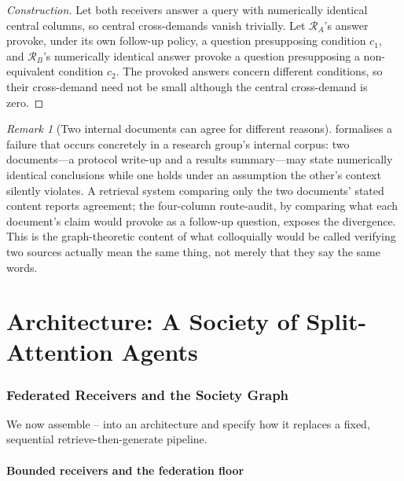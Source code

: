 \documentclass[11pt,twocolumn,a4paper]{article}
\theoremstyle{frathm}
\theoremstyle{definition}
\theoremstyle{remark}
\newtheorem{remark}[theorem]{Remark}
\newcommand{\Rec}{\mathcal{R}}
\begin{document}
\begin{proof}[Construction]
Let both receivers answer a query with numerically identical central
columns, so central cross-demands vanish trivially. Let $\Rec_A$'s answer
provoke, under its own follow-up policy, a question presupposing
condition $c_1$, and $\Rec_B$'s numerically identical answer provoke a
question presupposing a non-equivalent condition $c_2$. The provoked
answers concern different conditions, so their cross-demand need not be
small although the central cross-demand is zero.
\end{proof}

\begin{remark}[Two internal documents can agree for different reasons]
\label{rem:false-friend-deployment}
 formalises a failure that occurs concretely in a
research group's internal corpus: two documents---a protocol write-up and
a results summary---may state numerically identical conclusions while one
holds under an assumption the other's context silently violates. A
retrieval system comparing only the two documents' stated content reports
agreement; the four-column route-audit, by comparing what each document's
claim would provoke as a follow-up question, exposes the divergence. This
is the graph-theoretic content of what colloquially would be called
verifying two sources actually mean the same thing, not merely that they
say the same words.
\end{remark}

\part{Architecture: A Society of Split-Attention Agents}

\section{Federated Receivers and the Society Graph}
\label{sec:architecture}

We now assemble -- into an
architecture and specify how it replaces a fixed, sequential
retrieve-then-generate pipeline.

\subsection{Bounded receivers and the federation floor}
\end{document}
